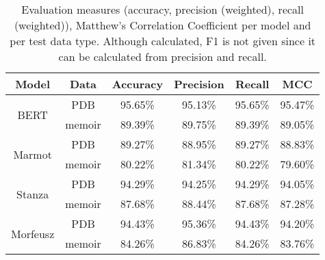 \renewcommand{\arraystretch}{1.25}
\begin{table}[H]
\begin{center}
\begin{tabular}{|cc|cccc|}
\hline \bf Model & \bf Data & \bf Accuracy & \bf Precision & \bf Recall & \bf MCC \\ \hline
\multirow{2}{4em}{BERT}
& PDB & 95.65\% & 95.13\% & 95.65\% & 95.47\% \\
& memoir & 89.39\% & 89.75\% & 89.39\% & 89.05\%  \\
\multirow{2}{4em}{Marmot}
& PDB & 89.27\% & 88.95\% & 89.27\% & 88.83\% \\
& memoir & 80.22\% & 81.34\% & 80.22\% & 79.60\% \\
\multirow{2}{4em}{Stanza}
& PDB & 94.29\% & 94.25\% & 94.29\% & 94.05\% \\
& memoir & 87.68\% & 88.44\% & 87.68\% & 87.28\% \\
\multirow{2}{4em}{Morfeusz}
& PDB & 94.43\% & 95.36\% & 94.43\% & 94.20\% \\
& memoir & 84.26\% & 86.83\% & 84.26\% & 83.76\% \\ 
\hline
\end{tabular}
\caption{\label{table:xpos} Evaluation measures (accuracy, precision (weighted), recall (weighted)), Matthew's Correlation Coefficient per model and per test data type. Although calculated, F1 is not given since it can be calculated from precision and recall.}
\end{center}
\end{table}

